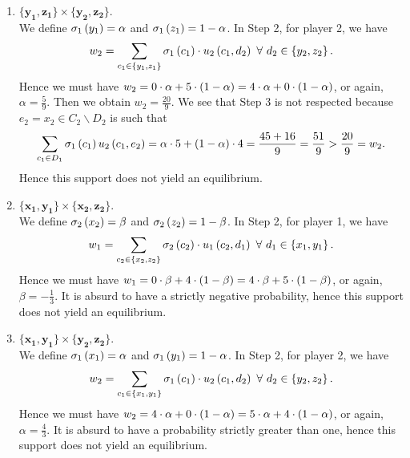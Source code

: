 \begin{enumerate} [label=\Alph*. ]
\begin{enumerate} [label*= (\arabic*)]
    
    
    \item $\mathbf{\{y_1, z_1\}} \times \mathbf{\{y_2, z_2\}}$. \\
    We define $\sigma_{1} \left(y_1\right) = \alpha$ and $\sigma_{1} \left(z_1\right) = 1 - \alpha$. In Step 2, for player 2, we have
    \begin{equation*}
        w_2 = \sum_{c_1 \in \left\{y_1, z_1\right\}} \sigma_{1} \left(c_1\right) \cdot u_2 \left(c_1, d_2\right) \ \forall \ d_2 \in \left\{y_2, z_2\right\}.
    \end{equation*}
    Hence we must have $w_2 = 0 \cdot \alpha + 5 \cdot \left(1 - \alpha\right) = 4 \cdot \alpha + 0 \cdot \left(1 - \alpha\right)$, or again, $\alpha = \frac{5}{9}$. Then we obtain $w_2 = \frac{20}{9}$. We see that Step 3 is not respected because $e_2 = x_2 \in C_2 \backslash D_2$ is such that 
    \begin{equation*}
        \sum_{c_{1} \in D_{1}} \sigma_{1} \left(c_1\right) u_2 \left(c_{1}, e_2\right)
        = \alpha \cdot 5 + \left(1 - \alpha\right) \cdot 4
        = \dfrac{45 + 16}{9}
        = \dfrac{51}{9}
        > \dfrac{20}{9}
        = w_2.
    \end{equation*}
    Hence this support does not yield an equilibrium.
    
    
    
    
    
    
    \item $\mathbf{\{x_1, y_1\}} \times \mathbf{\{x_2, z_2\}}$. \\
    We define $\sigma_{2} \left(x_2\right) = \beta$ and $\sigma_{2} \left(z_2\right) = 1 - \beta$. In Step 2, for player 1, we have
    \begin{equation*}
        w_1 = \sum_{c_2 \in \left\{x_2, z_2\right\}} \sigma_{2} \left(c_2\right) \cdot u_1 \left(c_2, d_1\right) \ \forall \ d_1 \in \left\{x_1, y_1\right\}.
    \end{equation*}
    Hence we must have $w_1 = 0 \cdot \beta + 4 \cdot \left(1 - \beta\right) = 4 \cdot \beta + 5 \cdot \left(1 - \beta\right)$, or again, $\beta = -\frac{1}{3}$. It is absurd to have a strictly negative probability, hence this support does not yield an equilibrium.
        
    
    \item $\mathbf{\{x_1, y_1\}} \times \mathbf{\{y_2, z_2\}}$. \\
    We define $\sigma_{1} \left(x_1\right) = \alpha$ and $\sigma_{1} \left(y_1\right) = 1 - \alpha$. In Step 2, for player 2, we have
    \begin{equation*}
        w_2 = \sum_{c_1 \in \left\{x_1, y_1\right\}} \sigma_{1} \left(c_1\right) \cdot u_2 \left(c_1, d_2\right) \ \forall \ d_2 \in \left\{y_2, z_2\right\}.
    \end{equation*}
    Hence we must have $w_2 = 4 \cdot \alpha + 0 \cdot \left(1 - \alpha\right) = 5 \cdot \alpha + 4 \cdot \left(1 - \alpha\right)$, or again, $\alpha = \frac{4}{3}$. It is absurd to have a probability strictly greater than one, hence this support does not yield an equilibrium.
    

\end{enumerate}
\end{enumerate}
